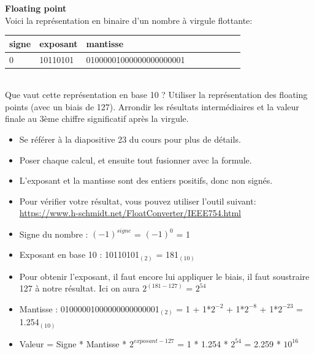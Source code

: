 \begin{Exercice}[10 minutes] \textbf{Floating point}\\
    
    Voici la représentation en binaire d'un nombre à virgule flottante: \\
    
     \begin{tabular}{| p{1cm} | p{3cm} | p{9.5cm} | p{1cm} | p{1cm} | p{1cm} | p{1cm} | p{1cm} | p{1cm} |} 
            \hline
            signe & exposant & mantisse \\ [0.5ex] 
            \hline
            0 & 10110101 & 01000001000000000000001 \\ [0.5ex]
            \hline
	\end{tabular}
	\\
    
    Que vaut cette représentation en base 10 ? Utiliser la représentation des floating points (avec un biais de 127). Arrondir les résultats intermédiaires et la valeur finale au 3ème chiffre significatif après la virgule. \\
	
    \begin{conseil}
    
    \begin{itemize}
    	\item Se référer à la diapositive 23 du cours pour plus de détails.
    	\item Poser chaque calcul, et ensuite tout fusionner avec la formule.
    	\item L'exposant et la mantisse sont des entiers positifs, donc non signés.
    	\item Pour vérifier votre résultat, vous pouvez utiliser l'outil suivant: \url{https://www.h-schmidt.net/FloatConverter/IEEE754.html}
    \end{itemize}
    
    \end{conseil}
    
    \begin{solution}
        \begin{itemize}
        	\item Signe du nombre : $(-1)^{signe}$ = $(-1)^0$ = 1
        	\item Exposant en base 10 : 10110101$_{(2)}$ = 181$_{(10)}$
        	\item Pour obtenir l'exposant, il faut encore lui appliquer le biais, il faut soustraire 127 à notre résultat. Ici on aura $2^{(181-127)}$ = $2^{54}$
        	\item Mantisse : 01000001000000000000001$_{(2)}$ = 1 + 1*$2^{-2}$ + 1*$2^{-8}$ + 1*$2^{-23}$ = 1.254$_{(10)}$
        	\item Valeur = Signe * Mantisse * $2^{exposant-127}$ = 1 * 1.254 * $2^{54}$ = 2.259 * $10^{16}$
        \end{itemize}
    \end{solution}
\end{Exercice}

